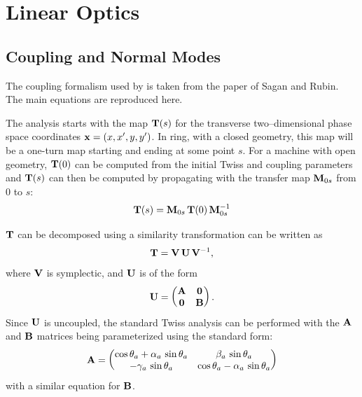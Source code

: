 \chapter{Linear Optics}

\section{Coupling and Normal Modes}
\label{s:coupling}

The coupling formalism used by \bmad is taken from the paper of Sagan and Rubin\cite{b:coupling}.
The main equations are reproduced here.

The analysis starts with the map ${\bf T}(s)$ for the transverse two--dimensional phase space
coordinates ${\bf x} = (x, x', y, y')$. In ring, with a closed geometry, this map will be a one-turn
map starting and ending at some point $s$. For a machine with open geometry, ${\bf T}(0)$ can be
computed from the initial Twiss and coupling parameters and ${\bf T}(s)$ can then be computed by
propagating with the transfer map ${\bf M}_{0s}$ from $0$ to $s$:
\begin{equation}
    {\bf T}(s) = {\bf M}_{0s} \, {\bf T}(0) \, {\bf M}_{0s}^{-1}
\end{equation}

${\bf T}$ can be decomposed using a similarity transformation
 can be written as
  \begin{equation}
    {\bf T} = {\bf V} \, {\bf U} \, {\bf V}^{-1} 
    , \label{tvuv}
  \end{equation} 
where ${\bf V}$ is symplectic, and ${\bf U}$ is of the form
  \begin{equation}
    {\bf U} =
    \begin{pmatrix}
      {\bf A} & {\bf 0} \cr 
      {\bf 0} & {\bf B} \cr
    \end{pmatrix}
    . \label{ua00b}
  \end{equation}
Since ${\bf U}$ is uncoupled, the standard Twiss analysis can be performed with the ${\bf A}$ and ${\bf B}$
matrices being parameterized using the standard form:
\begin{equation}
  {\bf A} = \begin{pmatrix}
    \cos\theta_a + \alpha_a \, \sin\theta_a & \beta_a \, \sin\theta_a \\
    -\gamma_a \, \sin\theta_a & \cos\theta_a - \alpha_a \, \sin\theta_a
    \end{pmatrix}
\end{equation}
with a similar equation for ${\bf B}$. 

